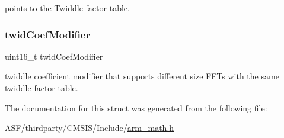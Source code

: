 points to the Twiddle factor table. \mbox{\label{structarm__cfft__radix4__instance__f32_afe772e5b5001c9d8e85032115a8df5bf}} 
\subsubsection{\texorpdfstring{twidCoefModifier}{twidCoefModifier}}
{\footnotesize\ttfamily uint16\+\_\+t twid\+Coef\+Modifier}

twiddle coefficient modifier that supports different size F\+F\+Ts with the same twiddle factor table. 

The documentation for this struct was generated from the following file\+:\begin{DoxyCompactItemize}
\item 
A\+S\+F/thirdparty/\+C\+M\+S\+I\+S/\+Include/\mbox{\hyperlink{arm__math_8h}{arm\+\_\+math.\+h}}\end{DoxyCompactItemize}
